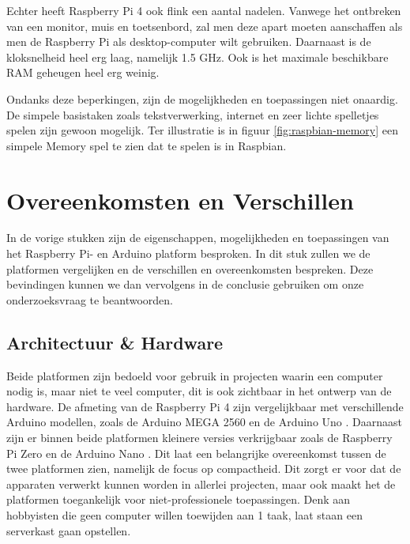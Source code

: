 \documentclass[a4paper, dutch, abstract=true]{scrartcl}
\begin{document}
Echter heeft Raspberry Pi 4 ook flink een aantal nadelen.
Vanwege het ontbreken van een monitor, muis en toetsenbord, zal men deze apart moeten aanschaffen
als men de Raspberry Pi als desktop-computer wilt gebruiken.
Daarnaast is de kloksnelheid heel erg laag, namelijk 1.5 GHz.
Ook is het maximale beschikbare RAM geheugen heel erg weinig.

Ondanks deze beperkingen, zijn de mogelijkheden en toepassingen niet onaardig.
De simpele basistaken zoals tekstverwerking, internet en zeer lichte spelletjes spelen zijn gewoon
mogelijk.
Ter illustratie is in figuur \ref{fig:raspbian-memory} een simpele Memory spel te zien dat te spelen
is in Raspbian.

\section{Overeenkomsten en Verschillen}
In de vorige stukken zijn de eigenschappen, mogelijkheden en toepassingen van het Raspberry Pi- en
Arduino platform besproken.
In dit stuk zullen we de platformen vergelijken en de verschillen en overeenkomsten bespreken.
Deze bevindingen kunnen we dan vervolgens in de conclusie gebruiken om onze onderzoeksvraag te
beantwoorden.

\subsection{Architectuur \& Hardware}
Beide platformen zijn bedoeld voor gebruik in projecten waarin een computer nodig is, maar niet te
veel computer, dit is ook zichtbaar in het ontwerp van de hardware.
De afmeting van de Raspberry Pi 4 \cite{raspberry2019brief} zijn vergelijkbaar met verschillende
Arduino modellen, zoals de Arduino MEGA 2560 \cite{arduino2019mega} en de Arduino Uno
\cite{arduino2019uno}.
Daarnaast zijn er binnen beide platformen kleinere versies verkrijgbaar zoals de Raspberry Pi Zero
\cite{raspberry2019buy} en de Arduino Nano \cite{arduino2019products}.
Dit laat een belangrijke overeenkomst tussen de twee platformen zien, namelijk de focus op
compactheid.
Dit zorgt er voor dat de apparaten verwerkt kunnen worden in allerlei projecten, maar ook maakt het
de platformen toegankelijk voor niet-professionele toepassingen.
Denk aan hobbyisten die geen computer willen toewijden aan 1 taak, laat staan een serverkast gaan
opstellen.
\end{document}
